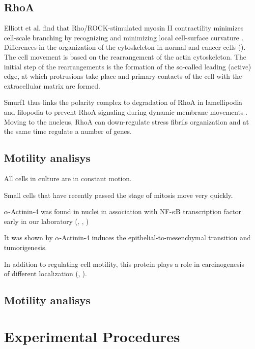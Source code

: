 \documentclass[alpha-refs]{wiley-article}
\begin{document}
\subsection{RhoA}

 Elliott et al. find that Rho/ROCK-stimulated myosin II contractility minimizes cell-scale branching by recognizing and minimizing local cell-surface curvature \cite{elliott2015myosin}.
 Differences in the organization of the cytoskeleton in normal and cancer cells (\cite{shutova2010normal}).
 The cell movement is based on the rearrangement of the actin cytoskeleton. The initial step of the rearrangements is the formation of the so-called leading (active) edge, at which protrusions take place and primary contacts of the cell with the extracellular matrix are formed.

 Smurf1 thus links the polarity complex to degradation of RhoA in lamellipodia and filopodia to prevent RhoA signaling during dynamic membrane movements \cite{wang2003regulation}.
 Moving to the nucleus, RhoA can down-regulate stress fibrils organization and at the same time regulate a number of genes.

\subsection{Motility analisys}

All cells in culture are in constant motion.

Small cells that have recently passed the stage of mitosis move very quickly.

$\alpha$-Actinin-4 was found in nuclei in association with NF-$\kappa$B transcription factor early in our laboratory (\cite{babakov2008rela}, \cite{lomert2018co}, \cite{bolshakova2007extra})

It was shown by \cite{an2016alpha} $\alpha$-Actinin-4 induces the epithelial-to-mesenchymal transition and tumorigenesis.

In addition to regulating cell motility, this protein plays a role in carcinogenesis of different localization (\cite{barbolina2008motility}, \cite{hsu2013alpha}).

\subsection{Motility analisys}


\section{Experimental Procedures}
\end{document}
